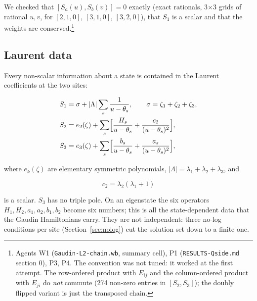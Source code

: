 \documentclass[11pt]{article}
\begin{document}
We checked that $[S_a(u),S_b(v)]=0$ exactly (exact rationals, 3$\times$3 grids of rational $u,v$, for $[2,1,0]$, $[3,1,0]$, $[3,2,0]$), that $S_1$ is a scalar and that the weights are conserved.\footnote{Agents W1 (\texttt{Gaudin-\allowbreak{}L2-\allowbreak{}chain.\allowbreak{}wb}, summary cell), P1 (\texttt{RESULTS-\allowbreak{}Qside.\allowbreak{}md} section 0), P3, P4.
The convention was not tuned: it worked at the first attempt.
The row-ordered product with $E_{ij}$ and the column-ordered product with $E_{ji}$ do \emph{not} commute (274 non-zero entries in $[S_2,S_3]$); the doubly flipped variant is just the transposed chain.}

\subsection{Laurent data}\label{sec:laurent}

Every non-scalar information about a state is contained in the Laurent coefficients at the two sites:

\begin{equation}
\begin{aligned}
S_1&=\sigma+|\Lambda|\sum_s\frac1{u-\theta_s},\qquad \sigma=\zeta_1+\zeta_2+\zeta_3,\\
S_2&=e_2(\zeta)+\sum_s\Bigl[\frac{H_s}{u-\theta_s}+\frac{c_2}{(u-\theta_s)^2}\Bigr],\\
S_3&=e_3(\zeta)+\sum_s\Bigl[\frac{b_s}{u-\theta_s}+\frac{a_s}{(u-\theta_s)^2}\Bigr],
\end{aligned}\label{eq:laurent}
\end{equation}

where $e_k(\zeta)$ are elementary symmetric polynomials, $|\Lambda|=\lambda_1+\lambda_2+\lambda_3$, and

\begin{equation}
c_2=\lambda_2(\lambda_1+1)\label{eq:c2}
\end{equation}

is a scalar. $S_3$ has no triple pole.
On an eigenstate the six operators $H_1,H_2,a_1,a_2,b_1,b_2$ become six numbers; this is all the state-dependent data that the Gaudin Hamiltonians carry.
They are not independent: three no-log conditions per site (Section~\ref{sec:nolog}) cut the solution set down to a finite one.
\end{document}

